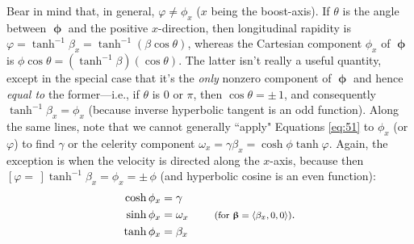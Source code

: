 \documentclass[12pt]{article}
\newcommand{\vvbeta}{\bm{\upbeta}}
\newcommand{\vvphi}{\bm{\upphi}}
\begin{document}
Bear in mind that, in general, $\varphi \neq \phi_x$ ($x$ being the boost-axis). If $\theta$ is the angle between $\vvphi$ and the positive $x$-direction, then longitudinal rapidity is $\varphi = \tanh^{-1} \beta_x = \tanh^{-1}{(\beta \cos{\theta})}$, whereas the Cartesian component $\phi_x$ of $\vvphi$ is $\phi \cos{\theta} = (\tanh^{-1}{\beta}) (\cos{\theta})$. The latter isn't really a useful quantity, except in the special case that it's the \emph{only} nonzero component of $\vvphi$ and hence \emph{equal to} the former---i.e., if $\theta$ is $0$ or $\pi$, then $\cos{\theta} = \pm \, 1$, and consequently $\tanh^{-1} \beta_x = \phi_x$ (because inverse hyperbolic tangent is an odd function). Along the same lines, note that we cannot generally ``apply" Equations \ref{eq:51} to $\phi_x$ (or $\varphi$) to find $\gamma$ or the celerity component $\omega_x = \gamma \beta_x = \cosh{\phi} \tanh{\varphi}$. Again, the exception is when the velocity is directed along the $x$-axis, because then $[\varphi = \, ] \tanh^{-1} \beta_x = \phi_x = \pm \, \phi$ (and hyperbolic cosine is an even function):
\begin{equation}\label{eq:rx}
\begin{aligned}
\cosh{\phi _x} &= \gamma \\
\sinh{\phi_x} &= \omega_x \qquad \textrm{\footnotesize{ (for $\vvbeta = \langle \beta_x, 0, 0 \rangle $)}} .\\
\tanh{\phi_x} &= \beta_x
\end{aligned}
\end{equation}
\end{document}
